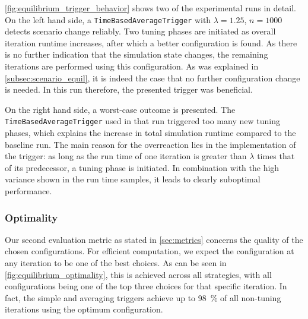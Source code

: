 
\autoref{fig:equilibrium_trigger_behavior} shows two of the experimental runs in detail.
On the left hand side, a \texttt{TimeBasedAverageTrigger} with $\lambda=1.25$, $n=1000$ detects scenario change reliably. Two tuning phases are initiated as overall iteration runtime increases, after which a better configuration is found. As there is no further indication that the simulation state changes, the remaining iterations are performed using this configuration. As was explained in \autoref{subsec:scenario_equil}, it is indeed the case that no further configuration change is needed. In this run therefore, the presented trigger was beneficial.

On the right hand side, a worst-case outcome is presented. The \texttt{TimeBasedAverageTrigger} used in that run triggered too many new tuning phases, which explains the increase in total simulation runtime compared to the baseline run. The main reason for the overreaction lies in the implementation of the trigger: as long as the run time of one iteration is greater than $\lambda$ times that of its predecessor, a tuning phase is initiated. In combination with the high variance shown in the run time samples, it leads to clearly suboptimal performance.






\subsubsection{Optimality}
Our second evaluation metric as stated in \autoref{sec:metrics} concerns the quality of the chosen configurations. For efficient computation, we expect the configuration at any iteration to be one of the best choices. As can be seen in \autoref{fig:equilibrium_optimality}, this is achieved across all strategies, with all configurations being one of the top three choices for that specific iteration. In fact, the simple and averaging triggers achieve up to \qty{98}{\percent} of all non-tuning iterations using the optimum configuration.

